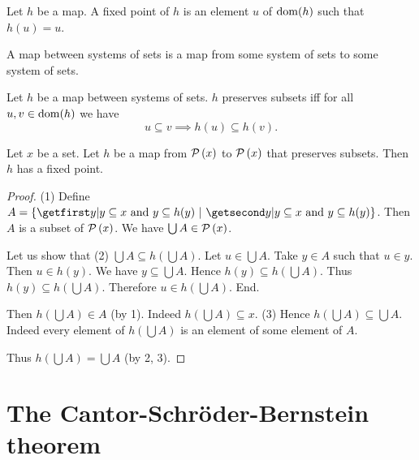 \documentclass{article}
\begin{document}
  \begin{forthel}
    \begin{definition*}
      Let $h$ be a map.
      A fixed point of $h$ is an element $u$ of $\operatorname{dom}(h)$ such that $h(u) = u$.
    \end{definition*}

    \begin{definition*}
      A map between systems of sets is a map from some system of sets to some
      system of sets.
    \end{definition*}

    \begin{definition*}
      Let $h$ be a map between systems of sets.
      $h$ preserves subsets iff for all $u, v \in \operatorname{dom}(h)$
      we have \[ u \subseteq v \implies h(u) \subseteq h(v). \]
    \end{definition*}

    \begin{theorem*}\label{KT}
      Let $x$ be a set.
      Let $h$ be a map from $\mathcal{P}\left(x\right)$ to $\mathcal{P}\left(x\right)$ that preserves subsets.
      Then $h$ has a fixed point.
    \end{theorem*}
    \begin{proof}
      (1) Define $A = \class{y | \text{$y \subseteq x$ and
      $y \subseteq h(y)$}}$.
      Then $A$ is a subset of $\mathcal{P}\left(x\right)$.
      We have $\bigcup A \in \mathcal{P}\left(x\right)$.

      Let us show that (2) $\bigcup A \subseteq h(\bigcup A)$.
        Let $u \in \bigcup A$.
        Take $y \in A$ such that $u \in y$.
        Then $u \in h(y)$.
        We have $y \subseteq \bigcup A$.
        Hence $h(y) \subseteq h(\bigcup A)$.
        Thus $h(y) \subseteq h(\bigcup A)$.
        Therefore $u \in h(\bigcup A)$.
      End.

      Then $h(\bigcup A) \in A$ (by 1).
      Indeed $h(\bigcup A) \subseteq x$.
      (3) Hence $h(\bigcup A) \subseteq \bigcup A$.
      Indeed every element of $h(\bigcup A)$ is an element of some element of
      $A$.

      Thus $h(\bigcup A) = \bigcup A$ (by 2, 3).
    \end{proof}
  \end{forthel}


  \section*{The Cantor-Schröder-Bernstein theorem}
\end{document}
